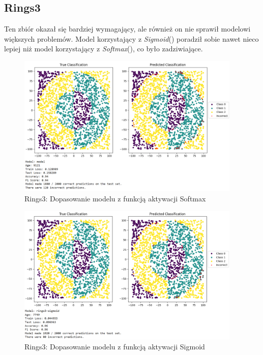 \documentclass{article}
\begin{document}
\subsection*{Rings3}
Ten zbiór okazał się bardziej wymagający, ale również on nie sprawił modelowi większych problemów. Model korzystający z \textit{Sigmoid}() poradził sobie nawet nieco lepiej niż model korzystający z \textit{Softmax}(), co było zadziwiające.
\begin{figure}[H]
    \centering
    \includegraphics[width=0.95\textwidth]{img/nn4/rings3_softmax.png}
    \caption{Rings3: Dopasowanie modelu z funkcją aktywacji Softmax}
\end{figure}
\begin{figure}[H]
    \centering
    \includegraphics[width=0.95\textwidth]{img/nn4/rings3_sigmoid.png}
    \caption{Rings3: Dopasowanie modelu z funkcją aktywacji Sigmoid} 
\end{figure}
\newpage
\end{document}
